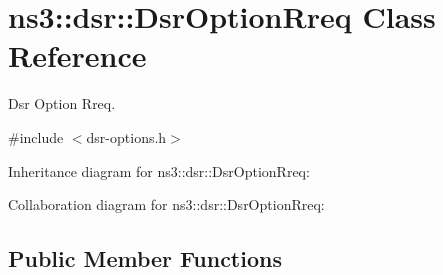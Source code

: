 \hypertarget{classns3_1_1dsr_1_1DsrOptionRreq}{}\section{ns3\+:\+:dsr\+:\+:Dsr\+Option\+Rreq Class Reference}
\label{classns3_1_1dsr_1_1DsrOptionRreq}


Dsr Option Rreq.  




{\ttfamily \#include $<$dsr-\/options.\+h$>$}



Inheritance diagram for ns3\+:\+:dsr\+:\+:Dsr\+Option\+Rreq\+:


Collaboration diagram for ns3\+:\+:dsr\+:\+:Dsr\+Option\+Rreq\+:
\subsection*{Public Member Functions}
